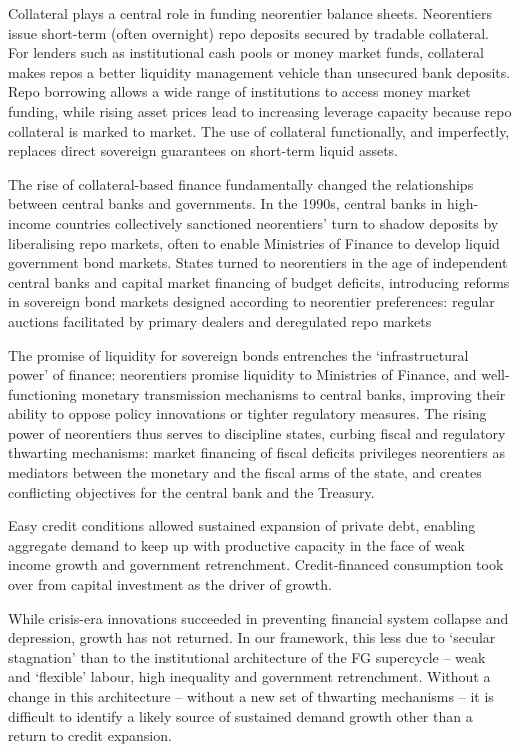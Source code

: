 \documentclass[
]{book}
\begin{document}
Collateral plays a central role in funding neorentier balance sheets.
Neorentiers issue short-term (often overnight) repo deposits secured by tradable collateral.
For lenders such as institutional cash pools or money market funds, collateral
makes repos a better liquidity management vehicle than unsecured bank deposits.
Repo borrowing allows a wide range of institutions to access money market
funding, while rising asset prices lead to increasing leverage capacity
because repo collateral is marked to market.
The use of collateral functionally, and imperfectly, replaces direct
sovereign guarantees on short-term liquid assets.

The rise of collateral-based finance fundamentally changed the relationships
between central banks and governments.
In the 1990s, central banks in high-income countries collectively sanctioned neorentiers'
turn to shadow deposits by liberalising repo markets,
often to enable Ministries of Finance to develop liquid government bond markets.
States turned to neorentiers in the age of
independent central banks and capital market financing of budget deficits, introducing reforms in
sovereign bond markets designed according to neorentier preferences:
regular auctions facilitated by primary dealers and deregulated repo markets

The promise of liquidity for sovereign bonds entrenches the `infrastructural power' of finance:
neorentiers promise liquidity to Ministries of Finance, and well-functioning monetary
transmission mechanisms to central banks, improving their ability to oppose policy innovations or
tighter regulatory measures.
The rising power of neorentiers thus serves to discipline
states, curbing fiscal and regulatory thwarting mechanisms:
market financing of fiscal deficits privileges neorentiers as mediators
between the monetary and the fiscal arms of the state, and
creates conflicting objectives for the central bank and the Treasury.

Easy credit conditions allowed sustained expansion of private debt,
enabling aggregate demand to keep up with productive capacity
in the face of weak income growth and government retrenchment.
Credit-financed consumption took over from capital investment as the driver of growth.

While crisis-era innovations succeeded in preventing financial system collapse and depression,
growth has not returned.
In our framework, this less due to `secular stagnation' than to the
institutional architecture of the FG supercycle --
weak and `flexible' labour, high inequality and government retrenchment.
Without a change in this architecture -- without a new set of thwarting mechanisms --
it is difficult to identify a likely source of sustained demand growth other than
a return to credit expansion.
\end{document}
